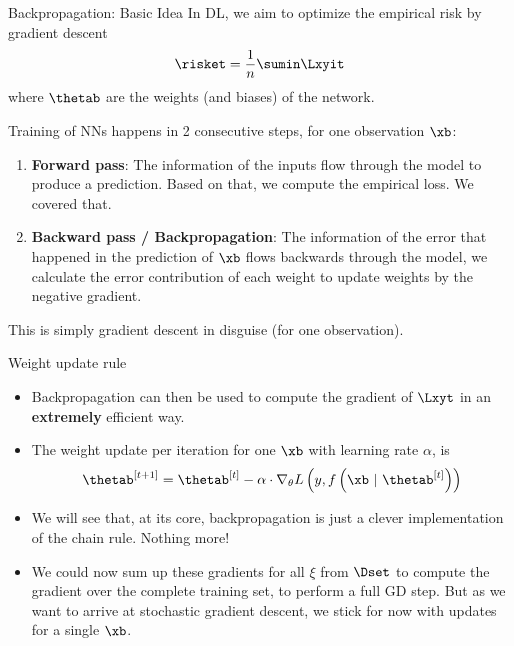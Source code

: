 






\begin{frame}{Backpropagation: Basic Idea}
In DL, we aim to optimize the empirical risk by gradient descent $$\risket = \frac{1}{n} \sumin \Lxyit$$ where $\thetab$ are the weights (and biases) of the network. 

Training of NNs happens in 2 consecutive steps, for one observation $\xb$:
\begin{enumerate}
\item \textbf{Forward pass}: The information of the inputs flow through the model to produce a prediction. Based on that, we compute the empirical loss. We covered that.
\item \textbf{Backward pass / Backpropagation}: The information of the error that happened in the prediction of $\xb$ flows backwards through the model, we calculate the error contribution of each weight to update weights by the negative gradient. 
\end{enumerate}
This is simply gradient descent in disguise (for one observation).
\end{frame}

\begin{vbframe}{Weight update rule}
  \begin{itemize}
    \item Backpropagation can then be used to compute the gradient of $\Lxyt$ in an \textbf{extremely} efficient way.
    \item The weight update per iteration for one $\xb$ with learning rate $\alpha$, is 
      $$\thetab^{[t+1]} = \thetab^{[t]} - \alpha \cdot \nabla_{\theta}L\left(y, f\left(\xb ~|~ \thetab^{[t]}\right)\right)$$ 
        \item We will see that, at its core, backpropagation is just a clever implementation of the chain rule. Nothing more!

  \item We could now sum up these gradients for all $\xi$ from $\Dset$ to compute the gradient over the complete training set, to perform a full GD step. But as we want to arrive at stochastic gradient descent, 
    we stick for now with updates for a single $\xb$.
  \end{itemize}
\end{vbframe}


